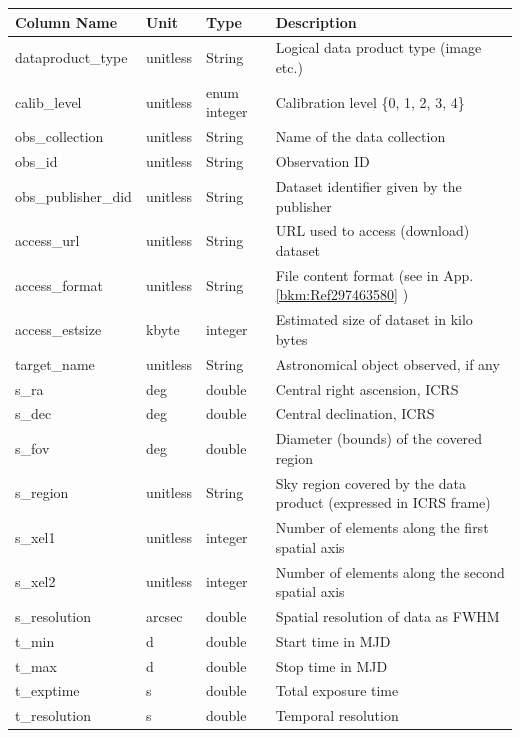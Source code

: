 \documentclass[11pt,a4paper]{ivoa}
\begin{document}
\begin{tabularx}{\textwidth}{|p{}|p{}|p{}|p{}|}
\hline
Column Name & Unit & Type & Description\\\hline
dataproduct\_type & unitless & String & Logical data product type (image etc.)\\\hline
calib\_level & unitless & enum integer  & Calibration level \{0, 1, 2, 3, 4\} \\\hline
obs\_collection & unitless & String & Name of the data collection \\\hline
obs\_id & unitless & String & Observation ID \\\hline
obs\_publisher\_did & unitless & String & Dataset identifier given by the publisher\\\hline
access\_url & unitless & String & URL used to access (download) dataset\\\hline
access\_format & unitless & String & File content format (see in App. \ref{bkm:Ref297463580} )\\\hline
access\_estsize & kbyte & integer & Estimated size of dataset in kilo bytes\\\hline
target\_name & unitless & String & Astronomical object observed, if any\\\hline
s\_ra & deg & double & Central right ascension, ICRS\\\hline
s\_dec & deg & double & Central declination, ICRS\\\hline
s\_fov & deg & double & Diameter (bounds) of the covered region \\\hline
s\_region & unitless & String & Sky region covered by the  data product (expressed in ICRS frame)\\\hline
s\_xel1 & unitless & integer & Number of elements along the first spatial axis\\\hline
s\_xel2 & unitless & integer & Number of elements along the second spatial axis\\\hline
s\_resolution & arcsec & double & Spatial resolution of data as FWHM\\\hline
t\_min & d & double & Start time in MJD\\\hline
t\_max & d & double & Stop time in MJD\\\hline
t\_exptime & s &  double & Total exposure time\\\hline
t\_resolution & s & double & Temporal resolution\\\hline

\end{tabularx}
\end{document}
